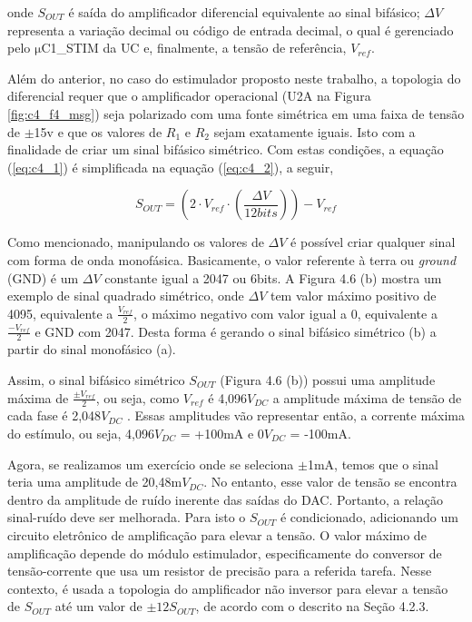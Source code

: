 onde $S_{OUT}$ é saída do amplificador diferencial equivalente ao sinal bifásico; $\Delta V$ representa a variação decimal ou código de entrada decimal, o qual é gerenciado pelo $\mathrm{\mu}$C1\_STIM da \acrshort{UC} e, finalmente, a tensão de referência, $V_{ref}$.

Além do anterior, no caso do estimulador proposto neste trabalho, a topologia do diferencial requer que o amplificador operacional (U2A na Figura \ref{fig:c4_f4_msg}) seja polarizado com uma fonte simétrica em uma faixa de tensão de $\mathrm{\pm}$15v e que os valores de $R_1$ e $R_2$ sejam exatamente iguais. Isto com a finalidade de criar um sinal bifásico simétrico. Com estas condições, a equação (\ref{eq:c4_1}) é simplificada na equação (\ref{eq:c4_2}), a seguir,

\begin{equation}
    S_{OUT} =\left(
2 \cdot V_{ref} \cdot 
\left(
\frac{\Delta V}{12bits}\right)\right)- V_{ref}
\label{eq:c4_2}
\end{equation}

Como mencionado, manipulando os valores de $\Delta V$ é possível criar qualquer sinal com forma de onda monofásica. Basicamente, o valor referente à terra ou \textit{ground} (\acrshort{GND}) é um $\Delta V$ constante igual a 2047 ou 6bits. A Figura 4.6 (b) mostra um exemplo de sinal quadrado simétrico, onde $\Delta V$ tem valor máximo positivo de 4095, equivalente a $\frac{V_{ref}}{2}$, o máximo negativo com valor igual a 0, equivalente a $\frac{-V_{ref}}{2}$ e \acrshort{GND} com 2047. Desta forma é gerando o sinal bifásico simétrico (b) a partir do sinal monofásico (a). 

Assim, o sinal bifásico simétrico $S_{OUT}$ (Figura 4.6 (b)) possui uma amplitude máxima de $\frac{\mathrm{\pm} V_{ref}}{2}$, ou seja, como $V_{ref}$  é 4,096$V_{DC}$ a amplitude máxima de tensão de cada fase é 2,048$V_{DC}$ . Essas amplitudes vão representar então, a corrente máxima do estímulo, ou seja, 4,096$V_{DC}$  = +100mA e 0$V_{DC}$  = -100mA.

Agora, se realizamos um exercício onde se seleciona $\mathrm{\pm}$1mA, temos que o sinal teria uma amplitude de 20,48m$V_{DC}$. No entanto, esse valor de tensão se encontra dentro da amplitude de ruído inerente das saídas do \acrshort{DAC}. Portanto, a relação sinal-ruído deve ser melhorada. Para isto o $S_{OUT}$  é condicionado, adicionando um circuito eletrônico de amplificação para elevar a tensão. O valor máximo de amplificação depende do módulo estimulador, especificamente do conversor de tensão-corrente que usa um resistor de precisão para a referida tarefa. Nesse contexto, é usada a topologia do amplificador não inversor para elevar a tensão de $S_{OUT}$  até um valor de $\mathrm{\pm}12S_{OUT}$, de acordo com o descrito na Seção 4.2.3. 

